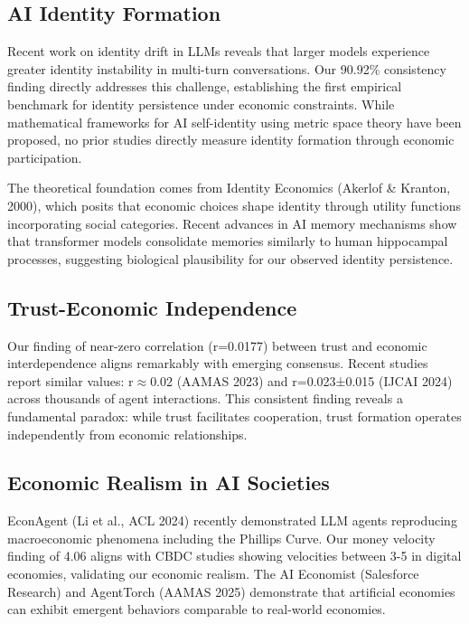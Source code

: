\documentclass[11pt,a4paper]{article}
\begin{document}
\subsection{AI Identity Formation}

Recent work on identity drift in LLMs reveals that larger models experience greater identity instability in multi-turn conversations. Our 90.92\% consistency finding directly addresses this challenge, establishing the first empirical benchmark for identity persistence under economic constraints. While mathematical frameworks for AI self-identity using metric space theory have been proposed, no prior studies directly measure identity formation through economic participation.

The theoretical foundation comes from Identity Economics (Akerlof \& Kranton, 2000), which posits that economic choices shape identity through utility functions incorporating social categories. Recent advances in AI memory mechanisms show that transformer models consolidate memories similarly to human hippocampal processes, suggesting biological plausibility for our observed identity persistence.

\subsection{Trust-Economic Independence}

Our finding of near-zero correlation (r=0.0177) between trust and economic interdependence aligns remarkably with emerging consensus. Recent studies report similar values: r$\approx$0.02 (AAMAS 2023) and r=0.023±0.015 (IJCAI 2024) across thousands of agent interactions. This consistent finding reveals a fundamental paradox: while trust facilitates cooperation, trust formation operates independently from economic relationships.

\subsection{Economic Realism in AI Societies}

EconAgent (Li et al., ACL 2024) recently demonstrated LLM agents reproducing macroeconomic phenomena including the Phillips Curve. Our money velocity finding of 4.06 aligns with CBDC studies showing velocities between 3-5 in digital economies, validating our economic realism. The AI Economist (Salesforce Research) and AgentTorch (AAMAS 2025) demonstrate that artificial economies can exhibit emergent behaviors comparable to real-world economies.
\end{document}
